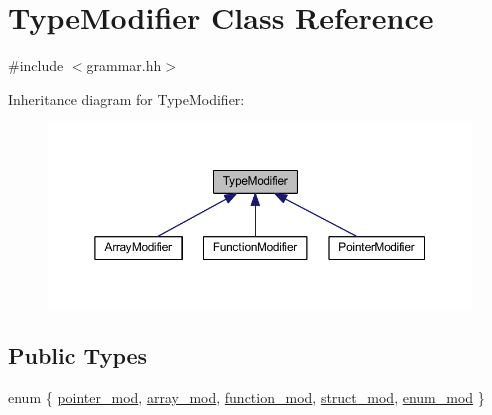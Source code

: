 \hypertarget{class_type_modifier}{}\section{Type\+Modifier Class Reference}
\label{class_type_modifier}


{\ttfamily \#include $<$grammar.\+hh$>$}



Inheritance diagram for Type\+Modifier\+:
\nopagebreak
\begin{figure}[H]
\begin{center}
\leavevmode
\includegraphics[width=350pt]{class_type_modifier__inherit__graph}
\end{center}
\end{figure}
\subsection*{Public Types}
\begin{DoxyCompactItemize}
\item 
enum \{ \newline
\mbox{\hyperlink{class_type_modifier_a5b036907331ce7a7b71fa40cfc277b78a8efdb8051919efe14b2bbd10de30c69b}{pointer\+\_\+mod}}, 
\mbox{\hyperlink{class_type_modifier_a5b036907331ce7a7b71fa40cfc277b78ae905c8de496bdacabcc39bff3d693285}{array\+\_\+mod}}, 
\mbox{\hyperlink{class_type_modifier_a5b036907331ce7a7b71fa40cfc277b78a3dfc3c1d42966b90198b4e780797d19a}{function\+\_\+mod}}, 
\mbox{\hyperlink{class_type_modifier_a5b036907331ce7a7b71fa40cfc277b78aea8ba6c2b873744d48a60713801b7035}{struct\+\_\+mod}}, 
\newline
\mbox{\hyperlink{class_type_modifier_a5b036907331ce7a7b71fa40cfc277b78a93725c402b235d8aa209e428aeddb5c0}{enum\+\_\+mod}}
 \}
\end{DoxyCompactItemize}
